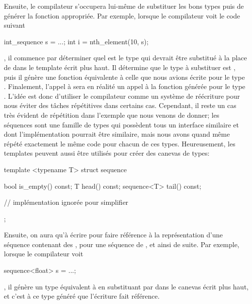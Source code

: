 Ensuite, le compilateur s'occupera lui-même de substituer les bons types puis
de générer la fonction appropriée. Par exemple, lorsque le compilateur voit le
code suivant
\begin{cpp}
    int_sequence s = ...;
    int i = nth_element(10, s);
\end{cpp}

, il commence par déterminer quel est le type qui devrait être substitué à
la place de  dans le template écrit plus haut. Il détermine
que le type à substituer est , puis il génère une fonction
équivalente à celle que nous avions écrite pour le type .
Finalement, l'appel à  sera en réalité un appel à la
fonction générée pour le type . L'idée est donc
d'utiliser le compilateur comme un système de réécriture pour nous
éviter des tâches répétitives dans certains cas. Cependant, il reste un cas
très évident de répétition dans l'exemple que nous venons de donner; les
séquences sont une famille de types qui possèdent tous un interface similaire
et dont l'implémentation pourrait être similaire, mais nous avons quand même
répété exactement le même code pour chacun de ces types. Heureusement, les
templates peuvent aussi être utilisés pour créer des canevas de types:
\begin{cpp}
    template <typename T>
    struct sequence {
        bool is_empty() const;
        T head() const;
        sequence<T> tail() const;

        // implémentation ignorée pour simplifier
    };
\end{cpp}

Ensuite, on aura qu'à écrire  pour faire référence à la
représentation d'une séquence contenant des , 
pour une séquence de , et ainsi de suite. Par exemple, lorsque le
compilateur voit
\begin{cpp}
    sequence<float> s = ...;
\end{cpp}

, il génère un type équivalent à  en substituant 
par  dans le canevas écrit plus haut, et c'est à ce type généré que
l'écriture  fait référence.

